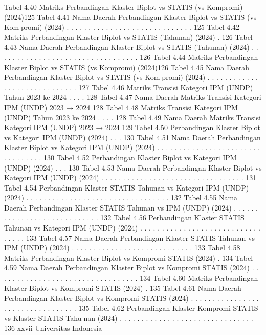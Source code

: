 Tabel 4.40 Matriks Perbandingan Klaster Biplot vs STATIS (vs Kompromi) (2024)125
Tabel 4.41 Nama Daerah Perbandingan Klaster Biplot vs STATIS (vs Kompromi) (2024) . . . . . . . . . . . . . . . . . . . . . . . . . . . . . 125
Tabel 4.42 Matriks Perbandingan Klaster Biplot vs STATIS (Tahunan) (2024) . 126
Tabel 4.43 Nama Daerah Perbandingan Klaster Biplot vs STATIS (Tahunan)
(2024) . . . . . . . . . . . . . . . . . . . . . . . . . . . . . . . . . 126
Tabel 4.44 Matriks Perbandingan Klaster Biplot vs STATIS (vs Kompromi) (2024)126
Tabel 4.45 Nama Daerah Perbandingan Klaster Biplot vs STATIS (vs Kompromi) (2024) . . . . . . . . . . . . . . . . . . . . . . . . . . . . . 127
Tabel 4.46 Matriks Transisi Kategori IPM (UNDP) Tahun 2023 ke 2024 . . . . 128
Tabel 4.47 Nama Daerah Matriks Transisi Kategori IPM (UNDP) 2023 → 2024 128
Tabel 4.48 Matriks Transisi Kategori IPM (UNDP) Tahun 2023 ke 2024 . . . . 128
Tabel 4.49 Nama Daerah Matriks Transisi Kategori IPM (UNDP) 2023 → 2024 129
Tabel 4.50 Perbandingan Klaster Biplot vs Kategori IPM (UNDP) (2024) . . . 130
Tabel 4.51 Nama Daerah Perbandingan Klaster Biplot vs Kategori IPM (UNDP)
(2024) . . . . . . . . . . . . . . . . . . . . . . . . . . . . . . . . . 130
Tabel 4.52 Perbandingan Klaster Biplot vs Kategori IPM (UNDP) (2024) . . . 130
Tabel 4.53 Nama Daerah Perbandingan Klaster Biplot vs Kategori IPM (UNDP)
(2024) . . . . . . . . . . . . . . . . . . . . . . . . . . . . . . . . . 131
Tabel 4.54 Perbandingan Klaster STATIS Tahunan vs Kategori IPM (UNDP)
(2024) . . . . . . . . . . . . . . . . . . . . . . . . . . . . . . . . . 132
Tabel 4.55 Nama Daerah Perbandingan Klaster STATIS Tahunan vs IPM
(UNDP) (2024) . . . . . . . . . . . . . . . . . . . . . . . . . . . . 132
Tabel 4.56 Perbandingan Klaster STATIS Tahunan vs Kategori IPM (UNDP)
(2024) . . . . . . . . . . . . . . . . . . . . . . . . . . . . . . . . . 133
Tabel 4.57 Nama Daerah Perbandingan Klaster STATIS Tahunan vs IPM
(UNDP) (2024) . . . . . . . . . . . . . . . . . . . . . . . . . . . . 133
Tabel 4.58 Matriks Perbandingan Klaster Biplot vs Kompromi STATIS (2024) . 134
Tabel 4.59 Nama Daerah Perbandingan Klaster Biplot vs Kompromi STATIS
(2024) . . . . . . . . . . . . . . . . . . . . . . . . . . . . . . . . . 134
Tabel 4.60 Matriks Perbandingan Klaster Biplot vs Kompromi STATIS (2024) . 135
Tabel 4.61 Nama Daerah Perbandingan Klaster Biplot vs Kompromi STATIS
(2024) . . . . . . . . . . . . . . . . . . . . . . . . . . . . . . . . . 135
Tabel 4.62 Perbandingan Klaster Kompromi STATIS vs Klaster STATIS Tahunan (2024) . . . . . . . . . . . . . . . . . . . . . . . . . . . . . . . 136
xxvii Universitas Indonesia

